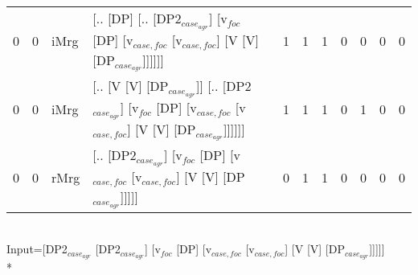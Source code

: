 \begin{tabularx}{\linewidth}{rrlXrrrrrrr}
   0 &   0 & iMrg & [.. [DP] [.. [DP2$_{case_{agr}}$] [v$_{foc}$ [DP] [v$_{case,foc}$ [v$_{case,foc}$] [V [V] [DP$_{case_{agr}}$]]]]]]                                                         &            1 &             1 &             1 &             0 &                  0 &              0 &            0 \\
   0 &   0 & iMrg & [.. [V [V] [DP$_{case_{agr}}$]] [.. [DP2$_{case_{agr}}$] [v$_{foc}$ [DP] [v$_{case,foc}$ [v$_{case,foc}$] [V [V] [DP$_{case_{agr}}$]]]]]]                                        &            1 &             1 &             1 &             0 &                  1 &              0 &            0 \\
   0 &   0 & rMrg & [.. [DP2$_{case_{agr}}$] [v$_{foc}$ [DP] [v$_{case,foc}$ [v$_{case,foc}$] [V [V] [DP$_{case_{agr}}$]]]]]                                                                   &            0 &             1 &             1 &             0 &                  0 &              0 &            0 \\
\hline
\end{tabularx}\endgroup\\
\begingroup\scriptsize Input=[DP2$_{case_{agr}}$ [DP2$_{case_{agr}}$] [v$_{foc}$ [DP] [v$_{case,foc}$ [v$_{case,foc}$] [V [V] [DP$_{case_{agr}}$]]]]]\\*
